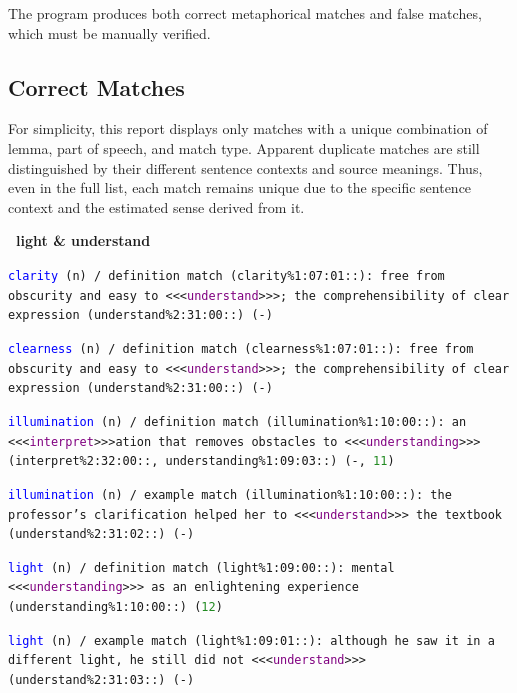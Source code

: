 \documentclass[12pt,a4paper]{article}
\begin{document}
The program produces both correct metaphorical matches and false matches, which must be manually verified.

\subsection*{Correct Matches}
{\small

For simplicity, this report displays only matches with a unique combination of lemma, part of speech, and match type. Apparent duplicate matches are still distinguished by their different sentence contexts and source meanings. Thus, even in the full list, each match remains unique due to the specific sentence context and the estimated sense derived from it.

\vspace{1em}

\noindent\textbf{\textbullet\ light \& understand}

\texttt{\textcolor{blue}{clarity} (n) / definition match (clarity\%1:07:01::): free from obscurity and easy to <<<\textcolor{purple}{understand}>>>; the comprehensibility of clear expression (understand\%2:31:00::) (-)}

\texttt{\textcolor{blue}{clearness} (n) / definition match (clearness\%1:07:01::): free from obscurity and easy to <<<\textcolor{purple}{understand}>>>; the comprehensibility of clear expression (understand\%2:31:00::) (-)} 

\texttt{\textcolor{blue}{illumination} (n) / definition match (illumination\%1:10:00::): an <<<\textcolor{purple}{interpret}>>>ation that removes obstacles to <<<\textcolor{purple}{understanding}>>> (interpret\%2:32:00::, understanding\%1:09:03::) (-, \textcolor{ForestGreen}{11})}

\texttt{\textcolor{blue}{illumination} (n) / example match (illumination\%1:10:00::): the professor's clarification helped her to <<<\textcolor{purple}{understand}>>> the textbook (understand\%2:31:02::) (-)}

\texttt{\textcolor{blue}{light} (n) / definition match (light\%1:09:00::): mental <<<\textcolor{purple}{understanding}>>> as an enlightening experience (understanding\%1:10:00::) (\textcolor{ForestGreen}{12})}

\texttt{\textcolor{blue}{light} (n) / example match (light\%1:09:01::): although he saw it in a different light, he still did not <<<\textcolor{purple}{understand}>>> (understand\%2:31:03::) (-)}

\vspace{1em}

}
\end{document}
